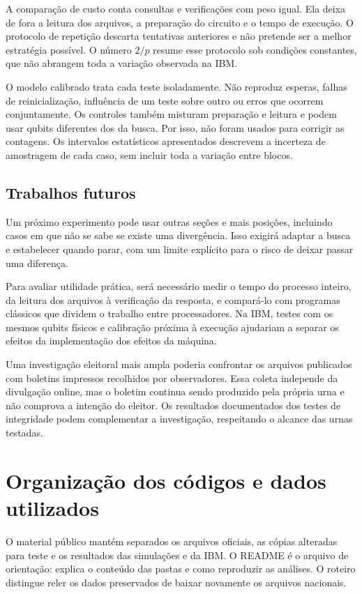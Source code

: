 A comparação de custo conta consultas e verificações com peso igual. Ela deixa de fora a leitura dos arquivos, a preparação do circuito e o tempo de execução. O protocolo de repetição descarta tentativas anteriores e não pretende ser a melhor estratégia possível. O número $2/p$ resume esse protocolo sob condições constantes, que não abrangem toda a variação observada na IBM.

O modelo calibrado trata cada teste isoladamente. Não reproduz esperas, falhas de reinicialização, influência de um teste sobre outro ou erros que ocorrem conjuntamente. Os controles também misturam preparação e leitura e podem usar qubits diferentes dos da busca. Por isso, não foram usados para corrigir as contagens. Os intervalos estatísticos apresentados descrevem a incerteza de amostragem de cada caso, sem incluir toda a variação entre blocos.

\subsection{Trabalhos futuros}
Um próximo experimento pode usar outras seções e mais posições, incluindo casos em que não se sabe se existe uma divergência. Isso exigirá adaptar a busca e estabelecer quando parar, com um limite explícito para o risco de deixar passar uma diferença.

Para avaliar utilidade prática, será necessário medir o tempo do processo inteiro, da leitura dos arquivos à verificação da resposta, e compará-lo com programas clássicos que dividem o trabalho entre processadores. Na IBM, testes com os mesmos qubits físicos e calibração próxima à execução ajudariam a separar os efeitos da implementação dos efeitos da máquina.

Uma investigação eleitoral mais ampla poderia confrontar os arquivos publicados com boletins impressos recolhidos por observadores. Essa coleta independe da divulgação online, mas o boletim continua sendo produzido pela própria urna e não comprova a intenção do eleitor. Os resultados documentados dos testes de integridade podem complementar a investigação, respeitando o alcance das urnas testadas.

\section{Organização dos códigos e dados utilizados}
O material público mantém separados os arquivos oficiais, as cópias alteradas para teste e os resultados das simulações e da IBM. O README é o arquivo de orientação: explica o conteúdo das pastas e como reproduzir as análises. O roteiro distingue reler os dados preservados de baixar novamente os arquivos nacionais.

